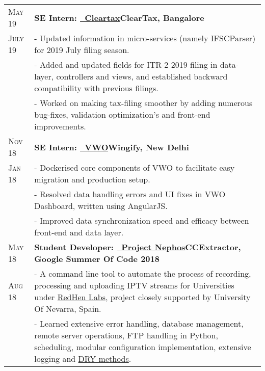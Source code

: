 \documentclass[a4paper,10pt]{extarticle} %
\begin{document}
\begin{tabularx}{\linewidth}{ l | X }

\textsc{May 19} & \textbf{SE Intern: {\href{https://cleartax.in/}{\ Cleartax}}}\hfill\textbf{ClearTax, Bangalore}\\
\textsc{July 19}& {- Updated information in micro-services (namely IFSCParser) for 2019 July filing season.}\\
& {- Added and updated fields for ITR-2 2019 filing in data-layer, controllers and views, and established backward compatibility with previous filings.}\\
& {- Worked on making tax-filing smoother by adding numerous bug-fixes, validation optimization's and front-end improvements.}\\

\textsc{Nov 18} & \textbf{SE Intern: {\href{https://vwo.com/}{\ VWO}}}\hfill\textbf{Wingify, New Delhi}\\
\textsc{Jan 18}& {- Dockerised core components of VWO to facilitate easy migration and production setup.}\\
& {- Resolved data handling errors and UI fixes in VWO Dashboard, written using AngularJS.}\\
& {- Improved data synchronization speed and efficacy between front-end and data layer.}\\

\textsc{May 18} & \textbf{Student Developer: {\href{https://github.com/thealphadollar/Nephos}{\ Project Nephos}}}\hfill\textbf{CCExtractor, Google Summer Of Code 2018}\\
\textsc{Aug 18}& {- A command line tool to automate the process of recording, processing and uploading IPTV streams for Universities under \href{http://www.redhenlab.org/}{RedHen Labs}, project closely supported by University Of Nevarra, Spain.}\\
& {- Learned extensive error handling, database management, remote server operations, FTP handling in Python, scheduling, modular configuration implementation, extensive logging and \href{https://thealphadollar.github.io/learning/2019/05/13/go-dry.html}{DRY methods}.}\\

\end{tabularx}

\vspace{-0.1cm}
\end{document}
